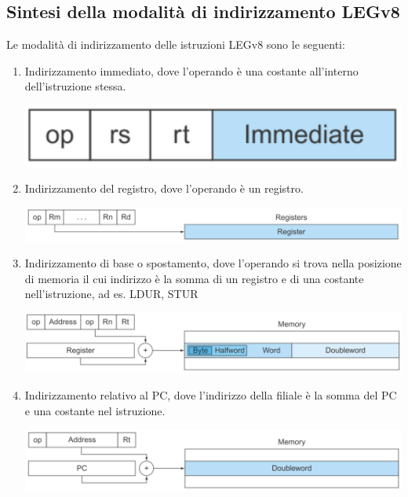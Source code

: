 \documentclass[12pt,a4paper]{article}
\begin{document}
\subsection{Sintesi della modalità di indirizzamento LEGv8}
Le modalità di indirizzamento delle istruzioni LEGv8 sono le seguenti:
\begin{enumerate}
\item Indirizzamento immediato, dove l'operando è una costante all'interno dell'istruzione stessa.
\begin{center}
\includegraphics[width=0.4\columnwidth]{img/immediate_adressing.png}
\end{center}
\item Indirizzamento del registro, dove l'operando è un registro.
\begin{center}
\includegraphics[width=0.6\columnwidth]{img/register_adressing.png}
\end{center}
\item Indirizzamento di base o spostamento, dove l'operando si trova nella posizione di memoria il cui indirizzo è la somma di un registro e di una costante nell'istruzione, ad es. LDUR, STUR
\begin{center}
\includegraphics[width=0.6\columnwidth]{img/base_adressing.png}
\end{center}
\item Indirizzamento relativo al PC, dove l'indirizzo della filiale è la somma del PC e una costante nel istruzione.
\begin{center}
\includegraphics[width=0.6\columnwidth]{img/pc_adressing.png}
\end{center}
\end{enumerate}
\end{document}
